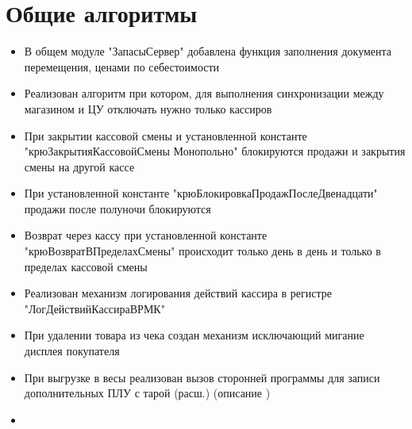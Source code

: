 \section{Общие алгоритмы}




\begin{itemize}
	\item В общем модуле "ЗапасыСервер" добавлена функция заполнения документа перемещения, ценами по себестоимости 
	\item Реализован алгоритм при котором, для выполнения синхронизации между магазином и ЦУ отключать нужно только кассиров	
	\item При закрытии кассовой смены и установленной константе "крюЗакрытияКассовойСмены Монопольно" блокируются продажи и закрытия смены на другой кассе	
	\item При установленной константе "крюБлокировкаПродажПослеДвенадцати" продажи после полуночи блокируются
	\item Возврат через кассу при установленной константе "крюВозвратВПределахСмены" происходит только день в день и только в пределах кассовой смены
	\item Реализован механизм логирования действий кассира в регистре "ЛогДействийКассираВРМК"
	\item При удалении товара из чека создан механизм исключающий мигание дисплея покупателя
	\item При выгрузке в весы реализован вызов сторонней программы для записи дополнительных ПЛУ с тарой
		(расш.)
	 (описание )
	\item 
\end{itemize}

